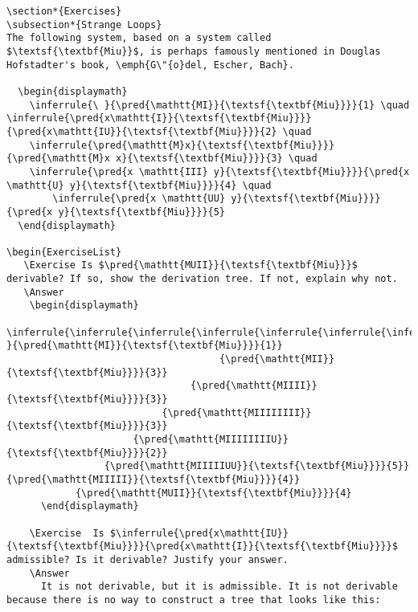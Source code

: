 \documentclass{book}
\begin{document}
\begin{verbatim}
\section*{Exercises}
\subsection*{Strange Loops}
The following system, based on a system called $\textsf{\textbf{Miu}}$, is perhaps famously mentioned in Douglas Hofstadter's book, \emph{G\"{o}del, Escher, Bach}.
  
  \begin{displaymath}
    \inferrule{\ }{\pred{\mathtt{MI}}{\textsf{\textbf{Miu}}}}{1} \quad \inferrule{\pred{x\mathtt{I}}{\textsf{\textbf{Miu}}}}{\pred{x\mathtt{IU}}{\textsf{\textbf{Miu}}}}{2} \quad
    \inferrule{\pred{\mathtt{M}x}{\textsf{\textbf{Miu}}}}{\pred{\mathtt{M}x x}{\textsf{\textbf{Miu}}}}{3} \quad
    \inferrule{\pred{x \mathtt{III} y}{\textsf{\textbf{Miu}}}}{\pred{x \mathtt{U} y}{\textsf{\textbf{Miu}}}}{4} \quad
        \inferrule{\pred{x \mathtt{UU} y}{\textsf{\textbf{Miu}}}}{\pred{x y}{\textsf{\textbf{Miu}}}}{5} 
  \end{displaymath}

\begin{ExerciseList}
   \Exercise Is $\pred{\mathtt{MUII}}{\textsf{\textbf{Miu}}}$ derivable? If so, show the derivation tree. If not, explain why not.
   \Answer
    \begin{displaymath}
        \inferrule{\inferrule{\inferrule{\inferrule{\inferrule{\inferrule{\inferrule{\inferrule{\ }{\pred{\mathtt{MI}}{\textsf{\textbf{Miu}}}}{1}}
                                     {\pred{\mathtt{MII}}{\textsf{\textbf{Miu}}}}{3}}
                                {\pred{\mathtt{MIIII}}{\textsf{\textbf{Miu}}}}{3}}
                           {\pred{\mathtt{MIIIIIIII}}{\textsf{\textbf{Miu}}}}{3}}
                      {\pred{\mathtt{MIIIIIIIIU}}{\textsf{\textbf{Miu}}}}{2}}
                 {\pred{\mathtt{MIIIIIUU}}{\textsf{\textbf{Miu}}}}{5}}{\pred{\mathtt{MIIIII}}{\textsf{\textbf{Miu}}}}{4}}
            {\pred{\mathtt{MUII}}{\textsf{\textbf{Miu}}}}{4}
      \end{displaymath}
   
    \Exercise  Is $\inferrule{\pred{x\mathtt{IU}}{\textsf{\textbf{Miu}}}}{\pred{x\mathtt{I}}{\textsf{\textbf{Miu}}}}$ admissible? Is it derivable? Justify your answer.
    \Answer
      It is not derivable, but it is admissible. It is not derivable because there is no way to construct a tree that looks like this:
     

\end{verbatim}
\end{document}
